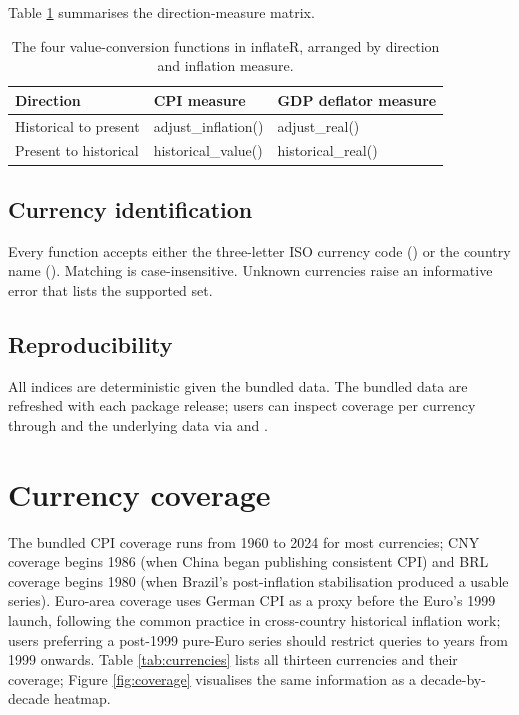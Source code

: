Table \ref{tab:directions} summarises the direction-measure matrix.

\begin{table}

\caption{\label{tab:directions}The four value-conversion functions in inflateR, arranged by direction and inflation measure.}
\centering
\begin{tabular}[t]{lll}
\toprule
Direction & CPI measure & GDP deflator measure\\
\midrule
Historical to present & adjust\_inflation() & adjust\_real()\\
Present to historical & historical\_value() & historical\_real()\\
\bottomrule
\end{tabular}
\end{table}

\subsection{Currency identification}\label{currency-identification}

Every function accepts either the three-letter ISO currency code
() or the country name ().
Matching is case-insensitive. Unknown currencies raise an
informative error that lists the supported set.

\subsection{Reproducibility}\label{reproducibility}

All indices are deterministic given the bundled data. The bundled
data are refreshed with each package release; users can inspect
coverage per currency through  and the
underlying data via  and
.

\section{Currency coverage}\label{currency-coverage}

The bundled CPI coverage runs from 1960 to 2024 for most
currencies; CNY coverage begins 1986 (when China began publishing
consistent CPI) and BRL coverage begins 1980 (when Brazil's
post-inflation stabilisation produced a usable series). Euro-area
coverage uses German CPI as a proxy before the Euro's 1999 launch,
following the common practice in cross-country historical
inflation work; users preferring a post-1999 pure-Euro series
should restrict queries to years from 1999 onwards. Table
\ref{tab:currencies} lists all thirteen currencies and their
coverage; Figure \ref{fig:coverage} visualises the same
information as a decade-by-decade heatmap.

